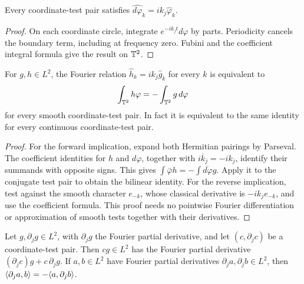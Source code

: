 \begin{lemma}
\label{lem:classical-partial-fourier}
\leanok
Every coordinate-test pair satisfies
$\widehat{d\varphi}_k=ik_j\hat\varphi_k$.
\end{lemma}

\begin{proof}
\leanok
On each coordinate circle, integrate $e^{-ik_jt}d\varphi$ by parts.
Periodicity cancels the boundary term, including at frequency zero.
Fubini and the coefficient integral formula give the result on $\mathbb{T}^2$.
\end{proof}

\begin{lemma}
\label{lem:partial-weak-equivalence}
\leanok
For $g,h\in L^2$, the Fourier relation $\hat h_k=ik_j\hat g_k$ for every $k$
is equivalent to
\[
 \int_{\mathbb{T}^2}h\varphi=-\int_{\mathbb{T}^2}g\,d\varphi
\]
for every smooth coordinate-test pair. In fact it is equivalent to the same
identity for every continuous coordinate-test pair.
\end{lemma}

\begin{proof}
\leanok
For the forward implication, expand both Hermitian pairings by Parseval.
The coefficient identities for $h$ and $d\varphi$, together with
$\overline{ik_j}=-ik_j$, identify their summands with opposite signs.
This gives $\int\bar\varphi h=-\int\overline{d\varphi}g$.
Apply it to the conjugate test pair to obtain the bilinear identity.
For the reverse implication, test against the smooth character $e_{-k}$,
whose classical derivative is $-ik_j e_{-k}$, and use the coefficient formula.
This proof needs no pointwise Fourier differentiation or approximation of
smooth tests together with their derivatives.
\end{proof}

\begin{lemma}
\label{lem:l2-product-rule}
\leanok
Let $g,\partial_jg\in L^2$, with $\partial_jg$ the Fourier partial derivative, and let
$(c,\partial_jc)$ be a coordinate-test pair. Then $cg\in L^2$ has the Fourier partial
derivative $(\partial_jc)g+c\,\partial_jg$. If $a,b\in L^2$ have Fourier partial
derivatives $\partial_ja,\partial_jb\in L^2$, then
$\langle \partial_ja,b\rangle=-\langle a,\partial_jb\rangle$.
\end{lemma}

